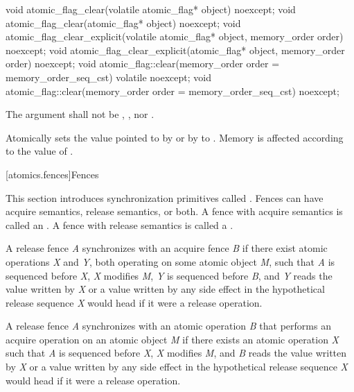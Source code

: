 %
%
%
\begin{itemdecl}
void atomic_flag_clear(volatile atomic_flag* object) noexcept;
void atomic_flag_clear(atomic_flag* object) noexcept;
void atomic_flag_clear_explicit(volatile atomic_flag* object, memory_order order) noexcept;
void atomic_flag_clear_explicit(atomic_flag* object, memory_order order) noexcept;
void atomic_flag::clear(memory_order order = memory_order_seq_cst) volatile noexcept;
void atomic_flag::clear(memory_order order = memory_order_seq_cst) noexcept;
\end{itemdecl}

\begin{itemdescr}
\pnum
\requires The  argument shall not be ,
, nor .

\pnum
\effects Atomically sets the value pointed to by  or by  to
. Memory is affected according to the value of .
\end{itemdescr}

[atomics.fences]{Fences}

\pnum
This section introduces synchronization primitives called . Fences can have
acquire semantics, release semantics, or both. A fence with acquire semantics is called
an . A fence with release semantics is called a .

\pnum
A release fence \textit{A} synchronizes with an acquire fence \textit{B} if there exist
atomic operations \textit{X} and \textit{Y}, both operating on some atomic object
\textit{M}, such that \textit{A} is sequenced before \textit{X}, \textit{X} modifies
\textit{M}, \textit{Y} is sequenced before \textit{B}, and \textit{Y} reads the value
written by \textit{X} or a value written by any side effect in the hypothetical release
sequence \textit{X} would head if it were a release operation.

\pnum
A release fence \textit{A} synchronizes with an atomic operation \textit{B} that
performs an acquire operation on an atomic object \textit{M} if there exists an atomic
operation \textit{X} such that \textit{A} is sequenced before \textit{X}, \textit{X}
modifies \textit{M}, and \textit{B} reads the value written by \textit{X} or a value
written by any side effect in the hypothetical release sequence \textit{X} would head if
it were a release operation.

